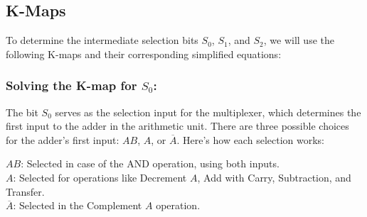 \documentclass{article}
\begin{document}
  \subsection{K-Maps}

To determine the intermediate selection bits $S_0$, $S_1$, and $S_2$, we will use the following K-maps and their corresponding simplified equations:
        

\subsubsection{Solving the K-map for $S_0$:}

The bit $S_0$ serves as the selection input for the multiplexer, which determines the first input to the adder in the arithmetic unit. There are three possible choices for the adder’s first input: $AB$, $A$, or $\overline{A}$. Here’s how each selection works:

$AB$: Selected in case of the AND operation, using both inputs.\\
$A$: Selected for operations like Decrement $A$, Add with Carry, Subtraction, and Transfer.\\
$\overline{A}$: Selected in the Complement $A$ operation.

\begin{center}
\end{center}
\end{document}

